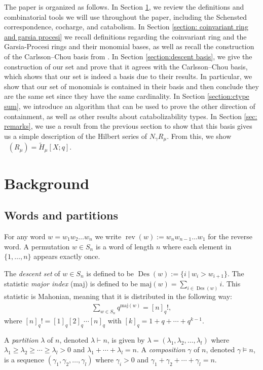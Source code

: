 \documentclass[ALCO, Unicode]{cedram}
\DeclareMathOperator{\Frob}{Frob}
\DeclareMathOperator{\rev}{rev}
\DeclareMathOperator{\des}{Des}
\DeclareMathOperator{\Frobq}{\Frob_q}
\newcommand{\mHL}{\tilde{H}}
\begin{document}
The paper is organized as follows. 
In Section \ref{section:background}, we review the definitions and  combinatorial tools we will use throughout the paper, including the Schensted correspondence, cocharge, and catabolism. 
In Section \ref{section: coinvariant ring and garsia procesi} we recall definitions regarding the coinvariant ring and the Garsia-Procesi rings and their monomial bases, as well as recall the construction of the Carlsson--Chou basis from \cite{CC}.
In Section \ref{section:descent basis}, we give the construction of our set and prove that it agrees with the Carlsson--Chou basis, which shows that our set is indeed a basis due to their results. In particular, we show that our set of monomials is contained in their basis and then conclude they are the same set since they have the same cardinality.
In Section \ref{section:ctype sum}, we introduce an algorithm that can be used to prove the other direction of containment, as well as other results about catabolizability types. 
In Section \ref{sec: remarks}, we use a result from the previous section to show that this basis gives us a simple description of the Hilbert series of $N_\gamma R_{\mu}$. From this, we show $\Frobq(R_{\mu})=\mHL_{\mu}[X;q]$.

\section{Background}\label{section:background}
\subsection{Words and partitions} \label{subsec: words and parts}
For any word $w =  w_1w_2\dots w_n$ we write  $\rev(w) := w_n w_{n-1}\dots w_1$ for the reverse word.  A permutation $w\in S_n$ is a word of length $n$ where each element in $\{1,\dots, n\}$ appears exactly once.

The \textit{descent set} of $w\in S_n$ is defined to be $\des (w) := \{i \ | \ w_i > w_{i+1}\}.$
The statistic \textit{major index} (maj) is defined to be
$\text{maj}(w) = \sum_{i \in \des(w)} i.$
This statistic is Mahonian, meaning that it is distributed in the following way:
\begin{align*}
  \sum\limits_{w\in S_n} q^{\text{maj}(w)} = [n]_q!,
\end{align*}
where $[n]_q! = [1]_q[2]_q\cdots [n]_q$ with $[k]_q = 1 + q+\cdots + q^{k-1}$.

A \textit{partition} $\lambda$ of $n$, denoted $\lambda\vdash n$,  is given by $\lambda = (\lambda_1,\lambda_2,\dots,\lambda_l)$ where $\lambda_1\geq \lambda_2\geq \cdots \geq \lambda_l>0$ and $\lambda_1+\cdots + \lambda_l = n$. A \textit{composition} $\gamma$ of $n$, denoted $\gamma\models n$, is a sequence $(\gamma_1,\gamma_2,\dots,\gamma_l)$ where $\gamma_i >0$ and $\gamma_1 + \gamma_2 + \cdots+\gamma_l = n$. 
\end{document}
